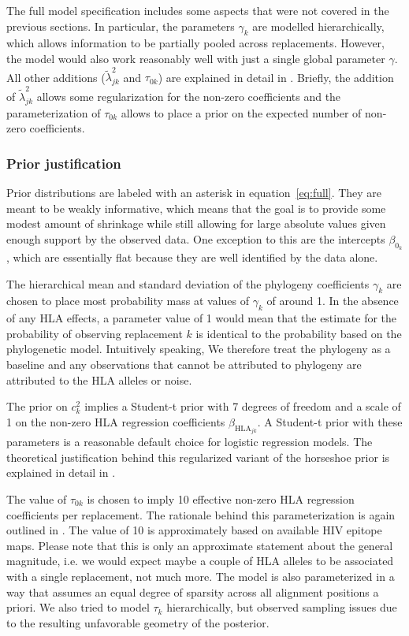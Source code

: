 \documentclass{bioinfo}
\begin{document}
\begin{methods}
The full model specification includes some aspects that were not covered in the previous sections. In particular, the parameters \(\gamma_{k}\) are modelled hierarchically, which allows information to be partially pooled across replacements. However, the model would also work reasonably well with just a single global parameter \(\gamma\). All other additions (\(\tilde{\lambda}_{jk}^{2}\) and \(\tau_{0k}\)) are explained in detail in \citep{Piironen2017}. Briefly, the addition of  \(\tilde{\lambda}_{jk}^{2}\) allows some regularization for the non-zero coefficients and the parameterization of \(\tau_{0k}\) allows to place a prior on the expected number of non-zero coefficients.

\subsubsection{Prior justification}

Prior distributions are labeled with an asterisk in equation~\ref{eq:full}. They are meant to be weakly informative, which means that the goal is to provide some modest amount of shrinkage while still allowing for large absolute values given enough support by the observed data. One exception to this are the intercepts \(\beta_{0_k}\), which are essentially flat because they are well identified by the data alone.

The hierarchical mean and standard deviation of the phylogeny coefficients \(\gamma_{k}\) are chosen to place most probability mass at values of \(\gamma_{k}\) of around 1. In the absence of any HLA effects, a parameter value of 1 would mean that the estimate for the probability of observing replacement \(k\) is identical to the probability based on the phylogenetic model. Intuitively speaking, We therefore treat the phylogeny as a baseline and any observations that cannot be attributed to phylogeny are attributed to the HLA alleles or noise.

The prior on \(c_{k}^{2}\) implies a Student-t prior with 7 degrees of freedom and a scale of 1 on the non-zero HLA regression coefficients \(\beta_{\text{HLA}_{jk}}\). A Student-t prior with these parameters is a reasonable default choice for logistic regression models. The theoretical justification behind this regularized variant of the horseshoe prior is explained in detail in \citet{Piironen2017}.

The value of \(\tau_{0k}\) is chosen to imply 10 effective non-zero HLA regression coefficients per replacement. The rationale behind this parameterization is again outlined in \citet{Piironen2017}. The value of 10 is approximately based on available HIV epitope maps. Please note that this is only an approximate statement about the general magnitude, i.e. we would expect maybe a couple of HLA alleles to be associated with a single replacement, not much more.
The model is also parameterized in a way that assumes an equal degree of sparsity across all alignment positions a priori. We also tried to model \(\tau_k\) hierarchically, but observed sampling issues due to the resulting unfavorable geometry of the posterior.



\end{methods}
\end{document}
